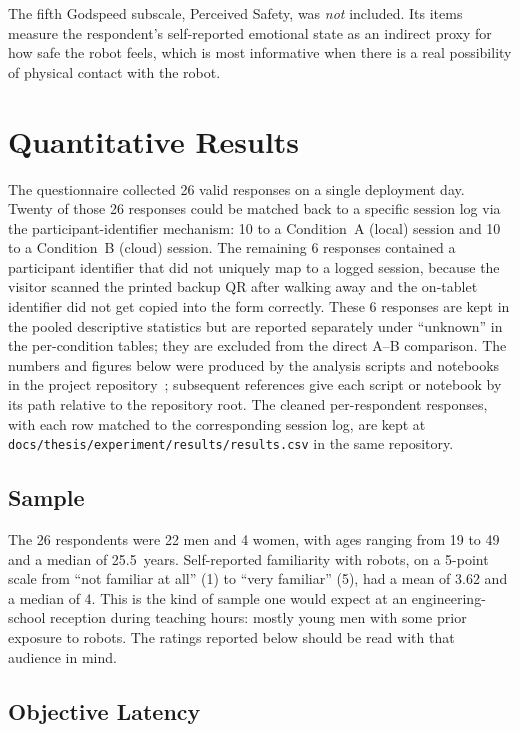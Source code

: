 The fifth Godspeed subscale, Perceived Safety, was \emph{not} included.
Its items measure the respondent's self-reported emotional state as an indirect proxy for how safe the robot feels, which is most informative when there is a real possibility of physical contact with the robot.

\section{Quantitative Results}
\label{sec:exp_results}

The questionnaire collected 26 valid responses on a single deployment day.
Twenty of those 26 responses could be matched back to a specific session log via the participant-identifier mechanism: 10 to a Condition~A (local) session and 10 to a Condition~B (cloud) session.
The remaining 6 responses contained a participant identifier that did not uniquely map to a logged session, because the visitor scanned the printed backup QR after walking away and the on-tablet identifier did not get copied into the form correctly.
These 6 responses are kept in the pooled descriptive statistics but are reported separately under ``unknown'' in the per-condition tables; they are excluded from the direct A--B comparison.
The numbers and figures below were produced by the analysis scripts and notebooks in the project repository~\cite{github-repo-thesis}; subsequent references give each script or notebook by its path relative to the repository root.
The cleaned per-respondent responses, with each row matched to the corresponding session log, are kept at \texttt{docs/thesis/experiment/results/results.csv} in the same repository.


\subsection{Sample}
\label{sec:exp_sample}

The 26 respondents were 22 men and 4 women, with ages ranging from 19 to 49 and a median of 25.5~years.
Self-reported familiarity with robots, on a 5-point scale from ``not familiar at all'' (1) to ``very familiar'' (5), had a mean of 3.62 and a median of 4.
This is the kind of sample one would expect at an engineering-school reception during teaching hours: mostly young men with some prior exposure to robots. The ratings reported below should be read with that audience in mind.


\subsection{Objective Latency}
\label{sec:exp_latency}

